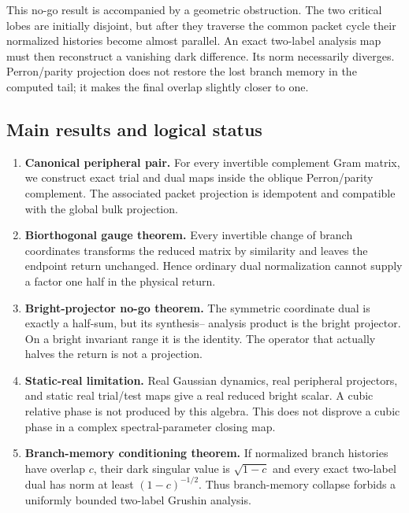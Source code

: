 \documentclass[11pt]{article}
\theoremstyle{definition}
\theoremstyle{remark}
\begin{document}
This no-go result is accompanied by a geometric obstruction.  The two
critical lobes are initially disjoint, but after they traverse the common
packet cycle their normalized histories become almost parallel.  An exact
two-label analysis map must then reconstruct a vanishing dark difference.
Its norm necessarily diverges.  Perron/parity projection does not restore
the lost branch memory in the computed tail; it makes the final overlap
slightly closer to one.

\subsection*{Main results and logical status}

\begin{enumerate}[label=\textbf{B\arabic*.},leftmargin=3.2em]
 \item \textbf{Canonical peripheral pair.}
 For every invertible complement Gram matrix, we construct exact trial and
 dual maps inside the oblique Perron/parity complement.  The associated
 packet projection is idempotent and compatible with the global bulk
 projection.

 \item \textbf{Biorthogonal gauge theorem.}
 Every invertible change of branch coordinates transforms the reduced matrix
 by similarity and leaves the endpoint return unchanged.  Hence ordinary
 dual normalization cannot supply a factor one half in the physical return.

 \item \textbf{Bright-projector no-go theorem.}
 The symmetric coordinate dual is exactly a half-sum, but its synthesis--
 analysis product is the bright projector.  On a bright invariant range it
 is the identity.  The operator that actually halves the return is not a
 projection.

 \item \textbf{Static-real limitation.}
 Real Gaussian dynamics, real peripheral projectors, and static real
 trial/test maps give a real reduced bright scalar.  A cubic relative phase
 is not produced by this algebra.  This does not disprove a cubic phase in a
 complex spectral-parameter closing map.

 \item \textbf{Branch-memory conditioning theorem.}
 If normalized branch histories have overlap $c$, their dark singular value
 is $\sqrt{1-c}$ and every exact two-label dual has norm at least
 $(1-c)^{-1/2}$.  Thus branch-memory collapse forbids a uniformly bounded
 two-label Grushin analysis.


\end{enumerate}
\end{document}
